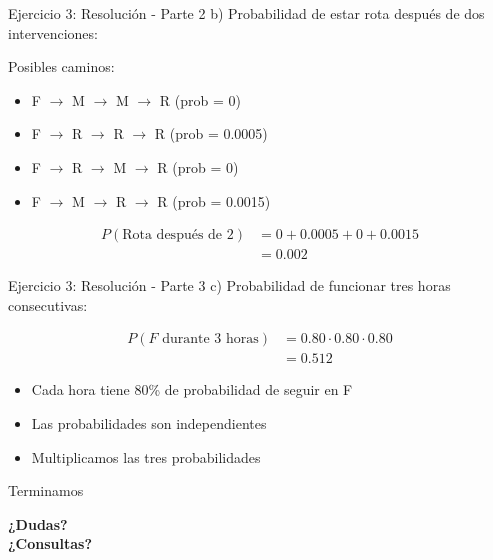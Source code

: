 \documentclass{beamer}
\begin{document}
\begin{frame}{Ejercicio 3: Resolución - Parte 2}
    b) Probabilidad de estar rota después de dos intervenciones:
    
    Posibles caminos:
    \begin{itemize}
        \item F $\rightarrow$ M $\rightarrow$ M $\rightarrow$ R (prob = 0)
        \item F $\rightarrow$ R $\rightarrow$ R $\rightarrow$ R (prob = 0.0005)
        \item F $\rightarrow$ R $\rightarrow$ M $\rightarrow$ R (prob = 0)
        \item F $\rightarrow$ M $\rightarrow$ R $\rightarrow$ R (prob = 0.0015)
    \end{itemize}
    
    \[
    \begin{split}
    P(\text{Rota después de 2}) &= 0 + 0.0005 + 0 + 0.0015 \\
    &= 0.002
    \end{split}
    \]
\end{frame}

\begin{frame}{Ejercicio 3: Resolución - Parte 3}
    c) Probabilidad de funcionar tres horas consecutivas:
    
    \[
    \begin{split}
    P(F \text{ durante 3 horas}) &= 0.80 \cdot 0.80 \cdot 0.80 \\
    &= 0.512
    \end{split}
    \]
    
    \begin{itemize}
        \item Cada hora tiene 80\% de probabilidad de seguir en F
        \item Las probabilidades son independientes
        \item Multiplicamos las tres probabilidades
    \end{itemize}
\end{frame}

\begin{frame}{Terminamos}
    \begin{center}
        \Large{\textbf{¿Dudas?\\¿Consultas?}}
    \end{center}
\end{frame}
\end{document}
